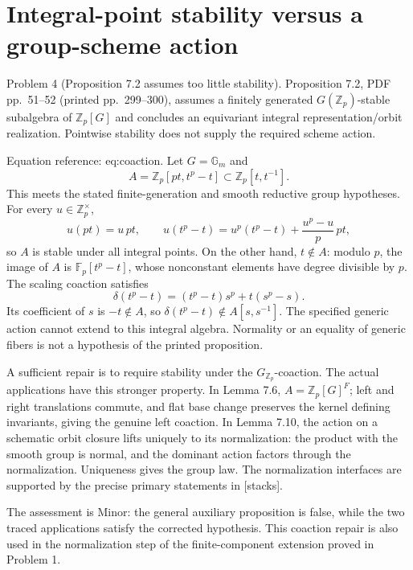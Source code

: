 \documentclass[10pt]{article}
\begin{document}
\section*{Integral-point stability versus a group-scheme action}
Problem 4 (Proposition 7.2 assumes too little stability).  Proposition 7.2, PDF pp. 51–52 (printed pp. 299–300), assumes a finitely generated \(G(\mathbb Z_p)\)-stable subalgebra of \(\mathbb Z_p[G]\) and concludes an equivariant integral representation/orbit realization. Pointwise stability does not supply the required scheme action.\par
Equation reference: eq:coaction. Let \(G=\mathbb G_m\) and \[A=\mathbb Z_p[pt,t^p-t]\subset\mathbb Z_p[t,t^{-1}].\] This meets the stated finite-generation and smooth reductive group hypotheses. For every \(u\in\mathbb Z_p^\times\), \[u(pt)=u\,pt,\qquad
 u(t^p-t)=u^p(t^p-t)+\frac{u^p-u}{p}\,pt ,\] so \(A\) is stable under all integral points. On the other hand, \(t\notin A\): modulo \(p\), the image of \(A\) is \(\mathbb F_p[t^p-t]\), whose nonconstant elements have degree divisible by \(p\). The scaling coaction satisfies \[
 \delta(t^p-t)=(t^p-t)s^p+t(s^p-s).\] Its coefficient of \(s\) is \(-t\notin A\), so \(\delta(t^p-t)\notin A[s,s^{-1}]\). The specified generic action cannot extend to this integral algebra. Normality or an equality of generic fibers is not a hypothesis of the printed proposition.\par
A sufficient repair is to require stability under the \(G_{\mathbb Z_p}\)-coaction. The actual applications have this stronger property. In Lemma 7.6, \(A=\mathbb Z_p[G]^F\); left and right translations commute, and flat base change preserves the kernel defining invariants, giving the genuine left coaction. In Lemma 7.10, the action on a schematic orbit closure lifts uniquely to its normalization: the product with the smooth group is normal, and the dominant action factors through the normalization. Uniqueness gives the group law. The normalization interfaces are supported by the precise primary statements in [stacks].\par
The assessment is Minor: the general auxiliary proposition is false, while the two traced applications satisfy the corrected hypothesis. This coaction repair is also used in the normalization step of the finite-component extension proved in Problem 1.\par
\end{document}
